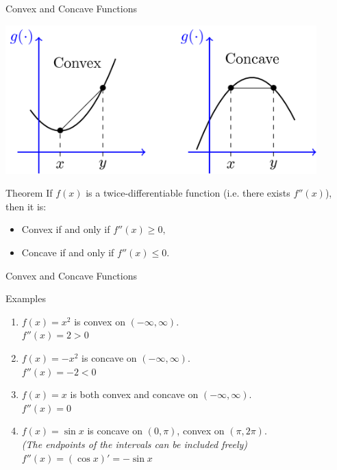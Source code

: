 \documentclass{beamer}
\begin{document}
\begin{frame}{Convex and Concave Functions}
        \begin{center}

    \includegraphics[width=0.9\textwidth, height=\textheight, keepaspectratio]{cxcv.png}
  \end{center}
\pause
    \begin{block}{Theorem}
        If $f(x)$ is a twice-differentiable function (i.e. there exists $f''(x)$), then it is:
        \begin{itemize}
            \item Convex if and only if $f''(x) \ge 0,$
            \item Concave if and only if $f''(x) \le 0.$
        \end{itemize}
    \end{block}
\end{frame}



\begin{frame}{Convex and Concave Functions}
    
    \begin{exampleblock}{Examples}
        \begin{enumerate}
            \item $f(x) = x^2$ is convex on $(-\infty, \infty)$.
            \\ $f''(x) = 2 > 0$
            \item $f(x) = -x^2$ is concave on $(-\infty, \infty)$.
            \\ $f''(x) = -2< 0$
            \item $f(x) = x$ is both convex and concave on $(-\infty, \infty)$.
            \\ $f''(x) = 0 $
            \item $f(x) = \sin x$ is concave on \pause $(0, \pi)$, \pause convex on $(\pi, 2\pi)$. \\\textit{(The endpoints of the intervals can be included freely)}
            \\ $f''(x) = (\cos x)' = -\sin x$
        \end{enumerate}
    \end{exampleblock}
\end{frame}
\end{document}
